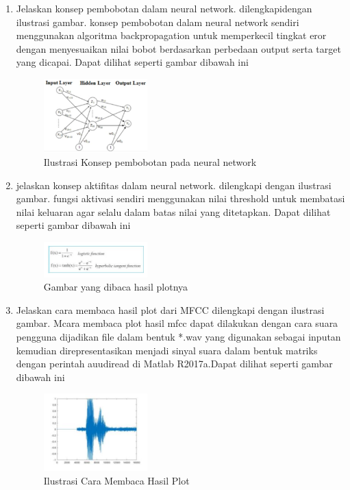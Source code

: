 \begin{enumerate}
        \item Jelaskan konsep pembobotan  dalam neural network. dilengkapidengan ilustrasi gambar.
        \subitem konsep pembobotan dalam neural network sendiri menggunakan algoritma backpropagation untuk memperkecil tingkat eror dengan menyesuaikan nilai bobot berdasarkan perbedaan output serta target yang dicapai. Dapat dilihat seperti gambar dibawah ini
        \begin{figure}[H]
            \includegraphics[width=4cm]{figures/1174039/chapter6/teori3.png}
            \centering
            \caption{Ilustrasi Konsep pembobotan pada neural network}
        \end{figure}
        
        \item jelaskan konsep aktifitas dalam neural network. dilengkapi dengan ilustrasi gambar.
        \subitem fungsi aktivasi sendiri menggunakan nilai threshold untuk membatasi nilai keluaran agar selalu dalam batas nilai yang ditetapkan. Dapat dilihat seperti gambar dibawah ini
        \begin{figure}[H]
            \includegraphics[width=4cm]{figures/1174039/chapter6/teori4.png}
            \centering
            \caption{Gambar yang dibaca hasil plotnya}
        \end{figure}
        
        \item Jelaskan cara membaca hasil plot dari MFCC dilengkapi dengan ilustrasi gambar. 
        \subitem Mcara membaca plot hasil mfcc dapat dilakukan dengan cara suara pengguna dijadikan file dalam bentuk *.wav yang digunakan sebagai inputan kemudian direpresentasikan menjadi sinyal suara dalam bentuk matriks dengan perintah auudiread di Matlab R2017a.Dapat dilihat seperti gambar dibawah ini
        \begin{figure}[H]
            \includegraphics[width=4cm]{figures/1174039/chapter6/teori5.png}
            \centering
            \caption{Ilustrasi Cara Membaca Hasil Plot}
        \end{figure}
        

\end{enumerate}
